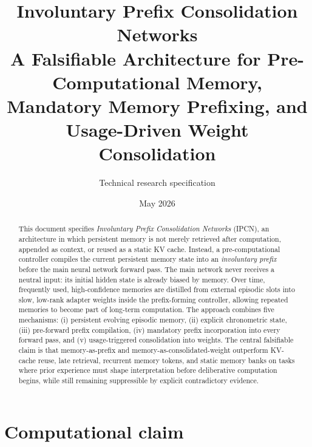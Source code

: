 \documentclass[11pt]{article}
\title{\textbf{Involuntary Prefix Consolidation Networks}\\
\large A Falsifiable Architecture for Pre-Computational Memory, Mandatory Memory Prefixing, and Usage-Driven Weight Consolidation}
\author{Technical research specification}
\date{May 2026}
\begin{document}
\maketitle

\begin{abstract}
This document specifies \emph{Involuntary Prefix Consolidation Networks} (IPCN), an architecture in which persistent memory is not merely retrieved after computation, appended as context, or reused as a static KV cache. Instead, a pre-computational controller compiles the current persistent memory state into an \emph{involuntary prefix} before the main neural network forward pass. The main network never receives a neutral input: its initial hidden state is already biased by memory. Over time, frequently used, high-confidence memories are distilled from external episodic slots into slow, low-rank adapter weights inside the prefix-forming controller, allowing repeated memories to become part of long-term computation. The approach combines five mechanisms: (i) persistent evolving episodic memory, (ii) explicit chronometric state, (iii) pre-forward prefix compilation, (iv) mandatory prefix incorporation into every forward pass, and (v) usage-triggered consolidation into weights. The central falsifiable claim is that memory-as-prefix and memory-as-consolidated-weight outperform KV-cache reuse, late retrieval, recurrent memory tokens, and static memory banks on tasks where prior experience must shape interpretation before deliberative computation begins, while still remaining suppressible by explicit contradictory evidence.
\end{abstract}

\section{Computational claim}
\end{document}
